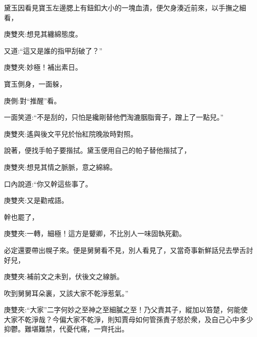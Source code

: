 \begin{parag}
    黛玉因看見寶玉左邊腮上有鈕釦大小的一塊血漬，便欠身湊近前來，以手撫之細看，\begin{note}庚雙夾:想見其纏綿態度。\end{note}又道:“這又是誰的指甲刮破了？”\begin{note}庚雙夾:妙極！補出素日。\end{note}寶玉側身，一面躲，\begin{note}庚側:對“推醒”看。\end{note}一面笑道:“不是刮的，只怕是纔剛替他們淘漉胭脂膏子，蹭上了一點兒。”\begin{note}庚雙夾:遙與後文平兒於怡紅院晚妝時對照。\end{note}說著，便找手帕子要揩拭。黛玉便用自己的帕子替他揩拭了，\begin{note}庚雙夾:想見其情之脈脈，意之綿綿。\end{note}口內說道:“你又幹這些事了。\begin{note}庚雙夾:又是勸戒語。\end{note}幹也罷了，\begin{note}庚雙夾:一轉，細極！這方是顰卿，不比別人一味固執死勸。\end{note}必定還要帶出幌子來。便是舅舅看不見，別人看見了，又當奇事新鮮話兒去學舌討好兒，\begin{note}庚雙夾:補前文之未到，伏後文之線脈。\end{note}吹到舅舅耳朵裏，又該大家不乾淨惹氣。”\begin{note}庚雙夾:“大家”二字何妙之至神之至細膩之至！乃父責其子，縱加以笞楚，何能使大家不乾淨哉？今偏大家不乾淨，則知賈母如何管孫責子怒於衆，及自己心中多少抑鬱。難堪難禁，代憂代痛，一齊托出。\end{note}
\end{parag}


